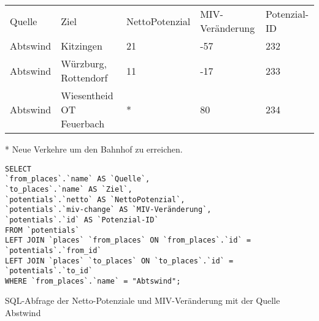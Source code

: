 \begin{tabular}{ l  l  l  l  l }
Quelle & Ziel & NettoPotenzial & MIV-Veränderung & Potenzial-ID\\ 
Abtswind & Kitzingen & 21 & -57 & 232\\ 
Abtswind & Würzburg, Rottendorf & 11 & -17 & 233\\ 
Abtswind & Wiesentheid OT Feuerbach & * & 80 & 234\\ 
\end{tabular}    
\newline
\newline
* Neue Verkehre um den Bahnhof zu erreichen.
\newline
\begin{listing}[htbp]
\begin{verbatim}
SELECT
`from_places`.`name` AS `Quelle`, 
`to_places`.`name` AS `Ziel`, 
`potentials`.`netto` AS `NettoPotenzial`, 
`potentials`.`miv-change` AS `MIV-Veränderung`, 
`potentials`.`id` AS `Potenzial-ID`
FROM `potentials`
LEFT JOIN `places` `from_places` ON `from_places`.`id` = `potentials`.`from_id`
LEFT JOIN `places` `to_places` ON `to_places`.`id` = `potentials`.`to_id`
WHERE `from_places`.`name` = "Abtswind";
\end{verbatim}
\caption{SQL-Abfrage der Netto-Potenziale und MIV-Veränderung mit der Quelle Abstwind}\label{lst-fz-abstwind}
\end{listing}
